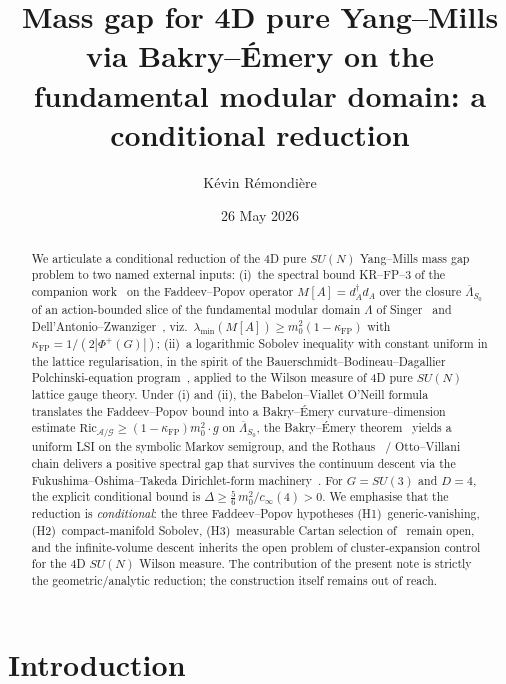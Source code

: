 \documentclass[11pt,a4paper]{amsart}
\title[Mass gap via Bakry--\'Emery on $\Lambda$]
{Mass gap for 4D pure Yang--Mills via Bakry--\'Emery on the
 fundamental modular domain: a conditional reduction}
\author{K\'evin R\'emondi\`ere}
\date{26 May 2026}
\theoremstyle{definition}
\newcommand{\Ric}{\mathrm{Ric}}
\newcommand{\kFP}{\kappa_{\mathrm{FP}}}
\newcommand{\cinf}{c_{\infty}}
\begin{document}
\begin{abstract}
We articulate a conditional reduction of the 4D pure $SU(N)$ Yang--Mills mass
gap problem to two named external inputs:
(i)~the spectral bound KR--FP--3 of the companion work~\cite{RemondiereKRFP3_2026}
on the Faddeev--Popov operator $M[A] = d_A^\dagger d_A$ over the closure
$\overline{\Lambda}_{S_0}$ of an action-bounded slice of the fundamental
modular domain $\Lambda$ of Singer~\cite{Singer1978} and
Dell'Antonio--Zwanziger~\cite{DellAntonioZwanziger1991}, viz.\
$\lambda_{\min}(M[A]) \geq m_0^2 (1-\kFP)$ with
$\kFP = 1/(2|\Phi^+(G)|)$;
(ii)~a logarithmic Sobolev inequality with constant uniform in the lattice
regularisation, in the spirit of the Bauerschmidt--Bodineau--Dagallier
Polchinski-equation program~\cite{BauerschmidtBodineauDagallier2024,
BauerschmidtDagallier2024}, applied to the Wilson measure of 4D pure
$SU(N)$ lattice gauge theory.
Under (i) and (ii), the Babelon--Viallet O'Neill formula~\cite{BabelonViallet1981}
translates the Faddeev--Popov bound into a Bakry--\'Emery curvature--dimension
estimate $\Ric_{\mathcal A/\mathcal G} \geq (1-\kFP) m_0^2 \cdot g$
on $\overline{\Lambda}_{S_0}$, the Bakry--\'Emery theorem~\cite{BakryEmery1985}
yields a uniform LSI on the symbolic Markov semigroup, and the
Rothaus~\cite{Rothaus1981} / Otto--Villani~\cite{OttoVillani2000} chain
delivers a positive spectral gap that survives the continuum descent via
the Fukushima--Oshima--Takeda Dirichlet-form
machinery~\cite{FukushimaOshimaTakeda1994}.
For $G=SU(3)$ and $D=4$, the explicit conditional bound is
$\Delta \geq \tfrac{5}{6}\, m_0^2 / \cinf(4) > 0$.
We emphasise that the reduction is \emph{conditional}: the three Faddeev--Popov
hypotheses (H1)~generic-vanishing, (H2)~compact-manifold Sobolev, (H3)~measurable
Cartan selection of~\cite{RemondiereKRFP3_2026} remain open, and the
infinite-volume descent inherits the open problem of cluster-expansion control
for the 4D $SU(N)$ Wilson measure. The contribution of the present note is
strictly the geometric/analytic reduction; the construction itself remains
out of reach.
\end{abstract}

\maketitle

\section{Introduction}\label{sec:intro}
\end{document}
